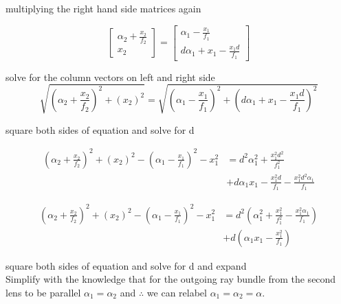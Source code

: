 \documentclass[main.tex]{subfiles}
\begin{document}
multiplying the right hand side matrices again

\begin{equation}
\begin{bmatrix}
    \alpha_2 + \frac{x_2}{f_2}\\
    x_2
\end{bmatrix}
=
\begin{bmatrix}
    \alpha_1 - \frac{x_1}{f_1} \\
    d\alpha_1 + x_1 - \frac{x_1 d}{f_1}
\end{bmatrix}
\end{equation}

solve for the column vectors on left and right side\\

\begin{equation}
\sqrt{(\alpha_2 + \frac{x_2}{f_2})^2 + (x_2)^2} = \sqrt{(\alpha_1 - \frac{x_1}{f_1})^2 + (d\alpha_1 + x_1 - \frac{x_1 d}{f_1})^2}
\end{equation}

square both sides of equation and solve for d

\begin{equation}
\begin{aligned}
(\alpha_2 + \frac{x_2}{f_2})^2 + (x_2)^2 - (\alpha_1 - \frac{x_1}{f_1})^2 -x_1^2 & = d^2\alpha_1^2 + \frac{x_1^2 d^2}{f_1^2}\\ 
                                                                               & + d \alpha_1 x_1 - \frac{x_1^2 d}{f_1} - \frac{x_1^2 d^2 \alpha_1}{f_1}
\end{aligned}
\end{equation}

\begin{equation}
\begin{aligned}
(\alpha_2 + \frac{x_2}{f_2})^2 + (x_2)^2 - (\alpha_1 - \frac{x_1}{f_1})^2 -x_1^2 & = d^2(\alpha_1^2 + \frac{x_1^2}{f_1^2} - \frac{x_1^2\alpha_1}{f_1})\\ 
                                                                                 & + d(\alpha_1 x_1 - \frac{x_1^2}{f_1})
\end{aligned}
\end{equation}

square both sides of equation and solve for d and expand \\

Simplify with the knowledge that for the outgoing ray bundle from the second lens to be parallel $\alpha_1 = \alpha_2$ and $\therefore$ we can relabel $\alpha_1 = \alpha_2 =\alpha$.\\
\end{document}
